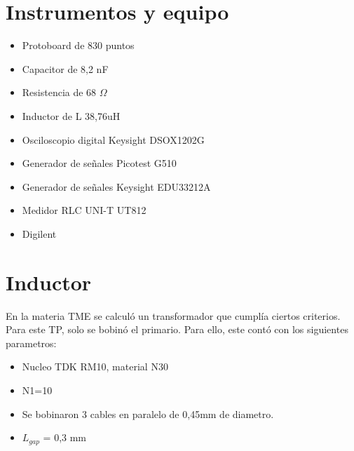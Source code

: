 \documentclass{article}
\begin{document}
\section{Instrumentos y equipo}

\begin{minipage}[t]{0.48\textwidth}
    \begin{itemize}
        \setlength{\itemsep}{2pt} %
        \item Protoboard de 830 puntos
        \item Capacitor de 8,2 nF
        \item Resistencia de 68 $\Omega$
        \item Inductor de L 38,76uH
        \item Osciloscopio digital Keysight DSOX1202G
    \end{itemize}
\end{minipage}%
\hfill %
\begin{minipage}[t]{0.48\textwidth}
    \begin{itemize}
        \setlength{\itemsep}{2pt}
        \item Generador de señales Picotest G510
        \item Generador de señales Keysight EDU33212A
        \item Medidor RLC UNI-T UT812
        \item Digilent 
    \end{itemize}
\end{minipage}
    
\section{Inductor}
    
    En la materia TME se calculó un transformador que cumplía ciertos criterios. Para este TP, solo se bobinó el primario. Para ello, este contó con los siguientes parametros:
    \begin{itemize}
\item Nucleo TDK RM10, material N30
\item N1=10
\item Se bobinaron 3 cables en paralelo de 0,45mm de diametro.
\item $L_{gap}$ = 0,3 mm
\end{itemize}
\end{document}

